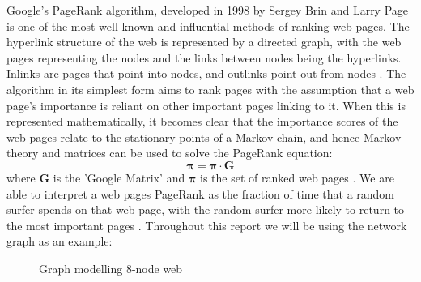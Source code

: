 Google's PageRank algorithm, developed in 1998 by Sergey Brin and Larry Page is one of the most well-known and influential methods of ranking web pages. The hyperlink structure of the web is represented by a directed graph, with the web pages representing the nodes and the links between nodes being the hyperlinks. Inlinks are pages that point into nodes, and outlinks point out from nodes \cite{brin1998anatomy}. The algorithm in its simplest form aims to rank pages with the assumption that a web page's importance is reliant on other important pages linking to it. When this is represented mathematically, it becomes clear that the importance scores of the web pages relate to the stationary points of a Markov chain, and hence Markov theory and matrices can be used to solve the PageRank equation:
\begin{equation}
\boldsymbol{\pi} = \boldsymbol{\pi} \cdot \textbf{G}
\end{equation}
where \textbf{G} is the 'Google Matrix' and $\boldsymbol{\pi}$ is the set of ranked web pages \cite{langville}. We are able to interpret a web pages PageRank as the fraction of time that a random surfer spends on that web page, with the random surfer more likely to return to the most important pages \cite{bonato}. Throughout this report we will be using the network graph as an example: 
\begin{figure}[H]
\centering
{}
\caption{Graph modelling 8-node web} \label{fig:Example}
\end{figure}

